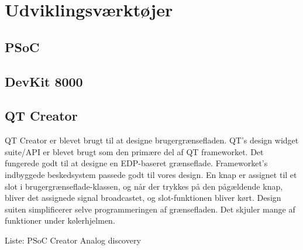 \chapter{Udviklingsværktøjer}

\section{PSoC}

\section{DevKit 8000}

\section{QT Creator}
QT Creator er blevet brugt til at designe brugergrænsefladen.
QT's design widget suite/API er blevet brugt som den primære del af QT frameworket. Det fungerede godt til at designe en EDP-baseret grænseflade. Frameworket's indbyggede beskedsystem passede godt til vores design.
En knap er assignet til et slot i brugergrænseflade-klassen, og når der trykkes på den pågældende knap, bliver det assignede signal broadcastet, og slot-funktionen bliver kørt.
Design suiten simplificerer selve programmeringen af grænsefladen. Det skjuler mange af funktioner under kølerhjelmen.

Liste:
PSoC Creator
Analog discovery
